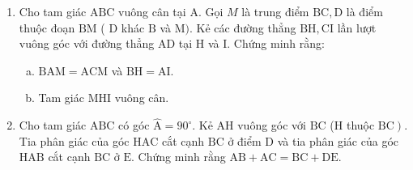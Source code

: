 \begin{bt}
    \hfill
    \begin{enumerate}[1)]
        \item Cho tam giác $\mathrm{ABC}$ vuông cân tại $\mathrm{A}$. Gọi $M$ là trung điểm $\mathrm{BC}, \mathrm{D}$ là điểm thuộc đoạn $\mathrm{BM}$ ( $\mathrm{D}$ khác $\mathrm{B}$ và $\mathrm{M})$. Kẻ các đường thẳng $\mathrm{BH}, \mathrm{CI}$ lần lượt vuông góc với đường thẳng $\mathrm{AD}$ tại $\mathrm{H}$ và $\mathrm{I}$. Chứng minh rằng:
        \begin{enumerate}[a.]
            \item $\mathrm{BAM}=\mathrm{ACM}$ và $\mathrm{BH}=\mathrm{AI}$.
            \item Tam giác MHI vuông cân.
        \end{enumerate}
        \item Cho tam giác $\mathrm{ABC}$ có góc $\widehat{\mathrm{A}}=90^{\circ}$. Kẻ $\mathrm{AH}$ vuông góc với $\mathrm{BC}$ (H thuộc $\left.\mathrm{BC}\right)$. Tia phân giác của góc $\mathrm{HAC}$ cắt cạnh $\mathrm{BC}$ ở điểm $\mathrm{D}$ và tia phân giác của góc $\mathrm{HAB}$ cắt cạnh $\mathrm{BC}$ ở $\mathrm{E}$. Chứng minh rằng $\mathrm{AB}+\mathrm{AC}=\mathrm{BC}+\mathrm{DE}$.
    \end{enumerate}
\end{bt}

